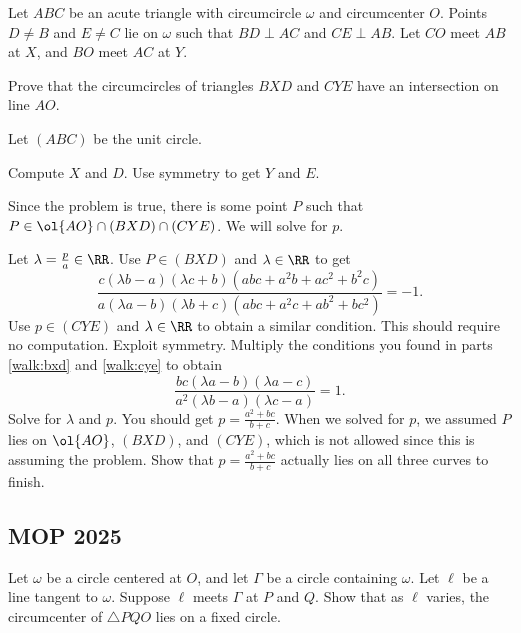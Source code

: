 \documentclass[11pt]{scrartcl}
\begin{document}
\begin{example}[ISL 2023 G5]
	Let $ABC$ be an acute triangle with circumcircle $\omega$ and circumcenter $O$. Points $D\neq B$ and $E\neq C$ lie on $\omega$ such that $BD\perp AC$ and $CE\perp AB$. Let $CO$ meet $AB$ at $X$, and $BO$ meet $AC$ at $Y$.

	Prove that the circumcircles of triangles $BXD$ and $CYE$ have an intersection on line $AO$.
\end{example}

\begin{walkthrough}
	Let $(ABC)$ be the unit circle.
	\begin{walk}
		\ii Compute $X$ and $D$. Use symmetry to get $Y$ and $E$.
	\end{walk}
	Since the problem is true, there is some point $P$ such that $P \in \ol{AO} \cap (BXD) \cap (CYE)$. We will solve for $p$.
	\begin{walk}[resume]
		\ii\label{walk:bxd} Let $\lambda = \frac pa \in \RR$. Use $P \in (BXD)$ and $\lambda \in \RR$ to get
		\[\frac{c(\lambda b - a)(\lambda c + b)(abc + a^2b + ac^2 + b^2c)}{a(\lambda a - b)(\lambda b + c)(abc + a^2c + ab^2 + bc^2)} = -1.\]
		\ii\label{walk:cye} Use $p \in (CYE)$ and $\lambda \in \RR$ to obtain a similar condition. This should require no computation. Exploit symmetry.
		\ii Multiply the conditions you found in parts \ref{walk:bxd} and \ref{walk:cye} to obtain
		\[\frac{bc(\lambda a - b)(\lambda a - c)}{a^2(\lambda b - a)(\lambda c - a)} = 1.\]
		Solve for $\lambda$ and $p$. You should get $p = \frac{a^2 + bc}{b + c}$.
		\ii When we solved for $p$, we assumed $P$ lies on $\ol{AO}$, $(BXD)$, and $(CYE)$, which is not allowed since this is assuming the problem. Show that $p = \frac{a^2 + bc}{b + c}$ actually lies on all three curves to finish.
	\end{walk}
\end{walkthrough}

\pagebreak

\subsection{MOP 2025}

\begin{example}[MOP 2025]
	Let $\omega$ be a circle centered at $O$, and let $\Gamma$ be a circle containing $\omega$. Let $\ell$ be a line tangent to $\omega$. Suppose $\ell$ meets $\Gamma$ at $P$ and $Q$. Show that as $\ell$ varies, the circumcenter of $\triangle PQO$ lies on a fixed circle.
\end{example}
\end{document}
